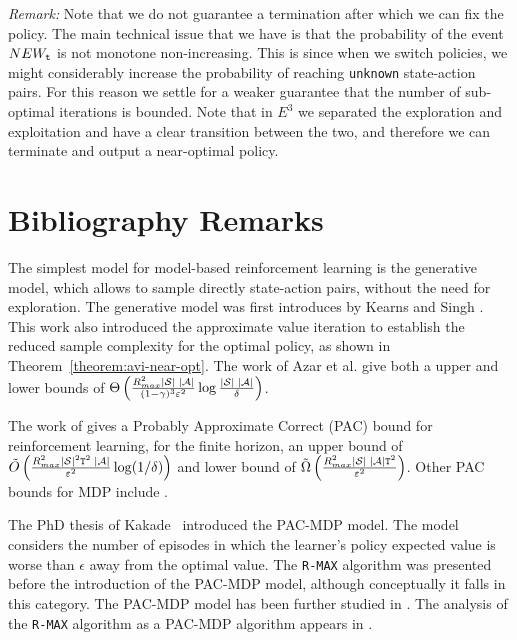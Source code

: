 \noindent\textit{Remark:} Note that we do not guarantee a termination after which we can fix the policy. The main technical issue that we have is that the probability of the event $NEW_{\tt t}$ is not monotone non-increasing. This is since when we switch policies, we might considerably increase the probability of reaching \texttt{unknown} state-action pairs. For this reason we settle for a weaker guarantee that the number of sub-optimal iterations is bounded. Note that in $E^3$ we separated the exploration and exploitation and have a clear transition between the two, and therefore we can terminate and output a near-optimal policy.


\section{Bibliography Remarks}

The simplest model for model-based reinforcement learning is the generative model, which allows to sample directly state-action pairs, without the need for exploration.
The generative model was first introduces by Kearns and Singh \cite{KearnsS98a}. This work also introduced the approximate value iteration to establish the reduced sample complexity for the optimal policy, as shown in Theorem~\ref{theorem:avi-near-opt}.
The work of Azar et al. \cite{AzarMK13} give both a upper and lower bounds of 
$
\Theta \left(\frac{R^2_{max}|\mathcal{S}|\;|\mathcal{A}|}{(1-\gamma)^3\varepsilon^2}\log \frac{ |\mathcal{S}| \;|\mathcal{A}| }{\delta}\right)
$.

The work of \cite{DannB15} gives a Probably Approximate Correct (PAC) bound for reinforcement learning, for the finite horizon, an upper bound of $
\tilde{O} \left(\frac{R^2_{max}|\mathcal{S}|^2{\tt T}^2\;|\mathcal{A}|}{\varepsilon^2}\log(1/\delta)\right)
$ and lower bound of $
\tilde{\Omega} \left(\frac{R^2_{max}|\mathcal{S}|\;|\mathcal{A}|{\tt T}^2}{\varepsilon^2}\right)
$. Other PAC bounds for MDP include \cite{SzitaL09,SzitaS10,LattimoreH14a}.

The PhD thesis of Kakade~\cite{Kakade2003} introduced the PAC-MDP model. The model considers the number of episodes in which the learner's policy expected value is worse than $\epsilon$ away from the optimal value. 
%
The {\tt R-MAX} algorithm  \cite{BrafmanT02} was presented before the introduction of the PAC-MDP model, although conceptually it falls in this category.
%
The PAC-MDP model has been further studied in  \cite{StrehlL08,StrehlLL09,Li2012}. The  analysis of the {\tt R-MAX} algorithm as a PAC-MDP algorithm appears in \cite{StrehlL08,SzitaL09}.

